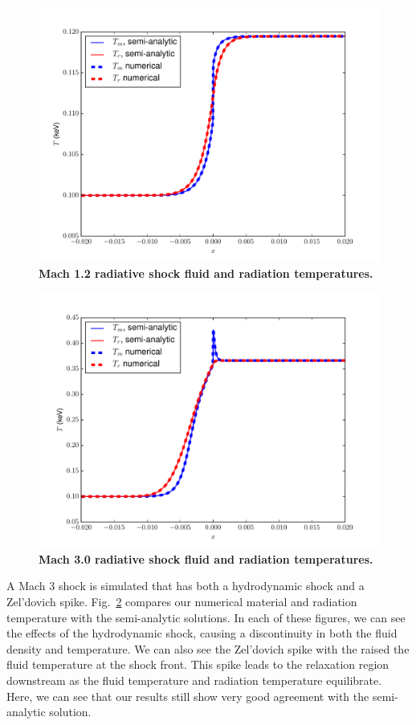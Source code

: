 \documentclass[preprint,12pt]{elsarticle}
\begin{document}
\begin{figure}[ht!]
\centering
\includegraphics[width=\textwidth]{figures/radshock_mach_1_2.pdf}
\caption{\label{fig:mach1.2T}\bf Mach 1.2 radiative shock fluid and radiation temperatures.} 
\end{figure}

\begin{figure}[ht!]
\centering
\includegraphics[width=\textwidth]{figures/radshock_mach_3_0.pdf}
\caption{\label{fig:mach3.0T}\bf Mach 3.0 radiative shock fluid and radiation temperatures.} 
\end{figure}


A Mach 3 shock is simulated that has both a hydrodynamic shock and a Zel'dovich spike.
Fig.~\ref{fig:mach3.0T} compares our numerical material and radiation temperature with the semi-analytic solutions.  In each of these
figures, we can see the effects of the hydrodynamic shock, causing a discontinuity in both the fluid density and
temperature.  We can also see the Zel'dovich spike with the raised the fluid temperature
at the shock front.  This spike leads to the relaxation region downstream as the fluid
temperature and radiation temperature equilibrate. Here, we can see that our results still
show very good agreement with the semi-analytic solution.
\end{document}

